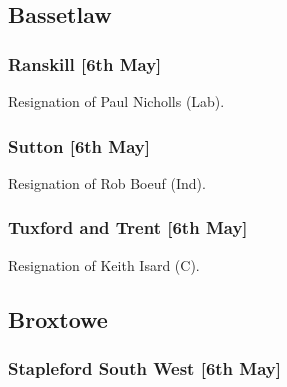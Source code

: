\documentclass[a4paper,openany]{book}
\begin{document}
\begin{resultsiii}
\subsection*{Bassetlaw}

\subsubsection*{Ranskill \hspace*{\fill}\nolinebreak[1]%
	\enspace\hspace*{\fill}
	[6th May]}


Resignation of Paul Nicholls (Lab).

\subsubsection*{Sutton \hspace*{\fill}\nolinebreak[1]%
	\enspace\hspace*{\fill}
	[6th May]}


Resignation of Rob Boeuf (Ind).

\subsubsection*{Tuxford and Trent \hspace*{\fill}\nolinebreak[1]%
	\enspace\hspace*{\fill}
	[6th May]}


Resignation of Keith Isard (C).

\subsection*{Broxtowe}

\subsubsection*{Stapleford South West \hspace*{\fill}\nolinebreak[1]%
	\enspace\hspace*{\fill}
	[6th May]}



\end{resultsiii}
\end{document}

